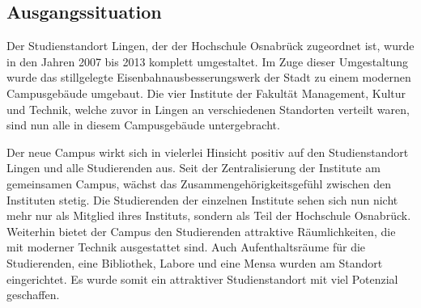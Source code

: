 \subsection{Ausgangssituation}
\label{sec:Ausgangssituation}

Der Studienstandort Lingen, der der Hochschule Osnabrück zugeordnet ist, wurde
in den Jahren 2007 bis 2013 komplett umgestaltet. Im Zuge dieser Umgestaltung
wurde das stillgelegte Eisenbahnausbesserungswerk der Stadt zu einem modernen
Campusgebäude umgebaut. Die vier Institute der Fakultät Management, Kultur und
Technik, welche zuvor in Lingen an verschiedenen Standorten verteilt
waren, sind nun alle in diesem Campusgebäude untergebracht.

Der neue Campus wirkt sich in vielerlei Hinsicht positiv auf den
Studienstandort Lingen und alle Studierenden aus. Seit der Zentralisierung der
Institute am gemeinsamen Campus, wächst das Zusammengehörigkeitsgefühl zwischen
den Instituten stetig. Die Studierenden der einzelnen Institute sehen sich nun
nicht mehr nur als Mitglied ihres Instituts, sondern als Teil der Hochschule
Osnabrück. Weiterhin bietet der Campus den Studierenden attraktive
Räumlichkeiten, die mit moderner Technik ausgestattet sind. Auch
Aufenthaltsräume für die Studierenden, eine Bibliothek, Labore und eine Mensa
wurden am Standort eingerichtet. Es wurde somit ein attraktiver Studienstandort
mit viel Potenzial geschaffen.